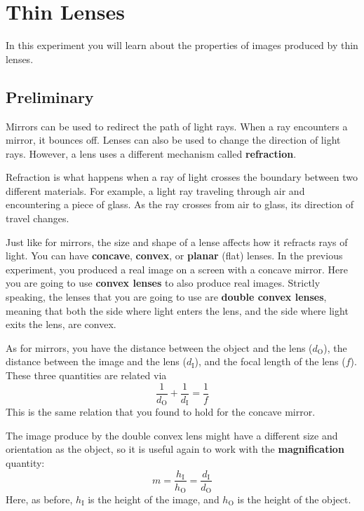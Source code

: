 \setcounter{chapter}{7}
\chapter{Thin Lenses}
%
In this experiment you will learn about the properties of images produced by thin lenses.
%
\section{Preliminary}
%
Mirrors can be used to redirect the path of light rays. When a ray encounters a mirror, it bounces off. Lenses can also be used to change the direction of light rays. However, a lens uses a different mechanism called \textbf{refraction}.

Refraction is what happens when a ray of light crosses the boundary between two different materials. For example, a light ray traveling through air and encountering a piece of glass. As the ray crosses from air to glass, its direction of travel changes.

Just like for mirrors, the size and shape of a lense affects how it refracts rays of light. You can have \textbf{concave}, \textbf{convex}, or \textbf{planar} (flat) lenses. In the previous experiment, you produced a real image on a screen with a concave mirror. Here you are going to use \textbf{convex lenses} to also produce real images. Strictly speaking, the lenses that you are going to use are \textbf{double convex lenses}, meaning that both the side where light enters the lens, and the side where light exits the lens, are convex.

As for mirrors, you have the distance between the object and the lens ($d_{\text{O}}$), the distance between the image and the lens ($d_{\text{I}}$), and the focal length of the lens ($f$). These three quantities are related via
\begin{equation}
    \frac{1}{d_{\text{O}}} + \frac{1}{d_{\text{I}}} = \frac{1}{f}
\end{equation}
This is the same relation that you found to hold for the concave mirror.

The image produce by the double convex lens might have a different size and orientation as the object, so it is useful again to work with the \textbf{magnification} quantity:
\begin{equation}
    m = \frac{h_{\text{I}}}{h_{\text{O}}} = \frac{d_{\text{I}}}{d_{\text{O}}}
\end{equation}
Here, as before, $h_{\text{I}}$ is the height of the image, and $h_{\text{O}}$ is the height of the object.
%
